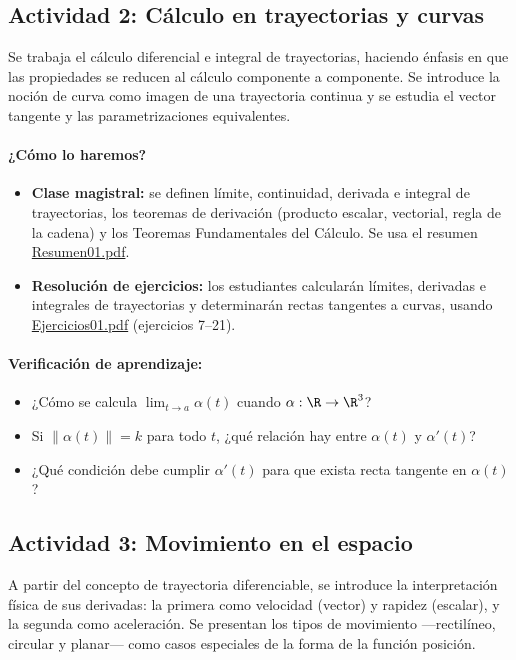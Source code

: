 \documentclass[a4,11pt]{aleph-notas}
\begin{document}
\subsection*{Actividad 2: Cálculo en trayectorias y curvas}
Se trabaja el cálculo diferencial e integral de trayectorias, haciendo énfasis en que las propiedades se reducen al cálculo componente a componente. Se introduce la noción de curva como imagen de una trayectoria continua y se estudia el vector tangente y las parametrizaciones equivalentes.

\paragraph{¿Cómo lo haremos?}
\begin{itemize}[leftmargin=*]
    \item \textbf{Clase magistral:} se definen límite, continuidad, derivada e integral de trayectorias, los teoremas de derivación (producto escalar, vectorial, regla de la cadena) y los Teoremas Fundamentales del Cálculo. Se usa el resumen \href{https://andres-merino.github.io/MatematicaIII-05-N0051/01Resumen/Resumen01.pdf}{Resumen01.pdf}.
    \item \textbf{Resolución de ejercicios:} los estudiantes calcularán límites, derivadas e integrales de trayectorias y determinarán rectas tangentes a curvas, usando \href{https://andres-merino.github.io/MatematicaIII-05-N0051/04Ejercicios/Ejercicios01.pdf}{Ejercicios01.pdf} (ejercicios 7--21).
\end{itemize}

\paragraph{Verificación de aprendizaje:}
\begin{itemize}[leftmargin=*]
    \item ¿Cómo se calcula $\lim_{t\to a}\alpha(t)$ cuando $\alpha:\R\to\R^3$?
    \item Si $\|\alpha(t)\|=k$ para todo $t$, ¿qué relación hay entre $\alpha(t)$ y $\alpha'(t)$?
    \item ¿Qué condición debe cumplir $\alpha'(t)$ para que exista recta tangente en $\alpha(t)$?
\end{itemize}

\subsection*{Actividad 3: Movimiento en el espacio}
A partir del concepto de trayectoria diferenciable, se introduce la interpretación física de sus derivadas: la primera como velocidad (vector) y rapidez (escalar), y la segunda como aceleración. Se presentan los tipos de movimiento —rectilíneo, circular y planar— como casos especiales de la forma de la función posición.
\end{document}
